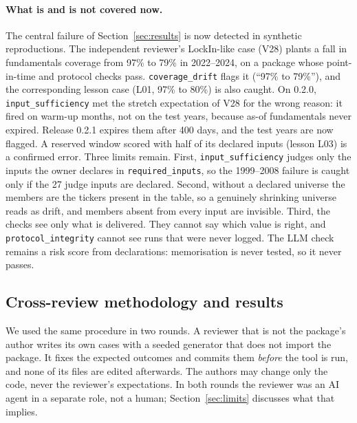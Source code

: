 \documentclass[11pt]{article}
\begin{document}
\paragraph{What is and is not covered now.} The central failure of Section~\ref{sec:results} is now detected in synthetic reproductions. The independent reviewer's LockIn-like case (V28) plants a fall in fundamentals coverage from 97\% to 79\% in 2022--2024, on a package whose point-in-time and protocol checks pass. \texttt{coverage\_drift} flags it (``97\% to 79\%''), and the corresponding lesson case (L01, 97\% to 80\%) is also caught. On 0.2.0, \texttt{input\_sufficiency} met the stretch expectation of V28 for the wrong reason: it fired on warm-up months, not on the test years, because as-of fundamentals never expired. Release 0.2.1 expires them after 400 days, and the test years are now flagged. A reserved window scored with half of its declared inputs (lesson L03) is a confirmed error. Three limits remain. First, \texttt{input\_sufficiency} judges only the inputs the owner declares in \texttt{required\_inputs}, so the 1999--2008 failure is caught only if the 27 judge inputs are declared. Second, without a declared universe the members are the tickers present in the table, so a genuinely shrinking universe reads as drift, and members absent from every input are invisible. Third, the checks see only what is delivered. They cannot say which value is right, and \texttt{protocol\_integrity} cannot see runs that were never logged. The LLM check remains a risk score from declarations: memorisation is never tested, so it never passes.

\subsection{Cross-review methodology and results}\label{sec:crossreview}

We used the same procedure in two rounds. A reviewer that is not the package's author writes its own cases with a seeded generator that does not import the package. It fixes the expected outcomes and commits them \emph{before} the tool is run, and none of its files are edited afterwards. The authors may change only the code, never the reviewer's expectations. In both rounds the reviewer was an AI agent in a separate role, not a human; Section~\ref{sec:limits} discusses what that implies.
\end{document}
